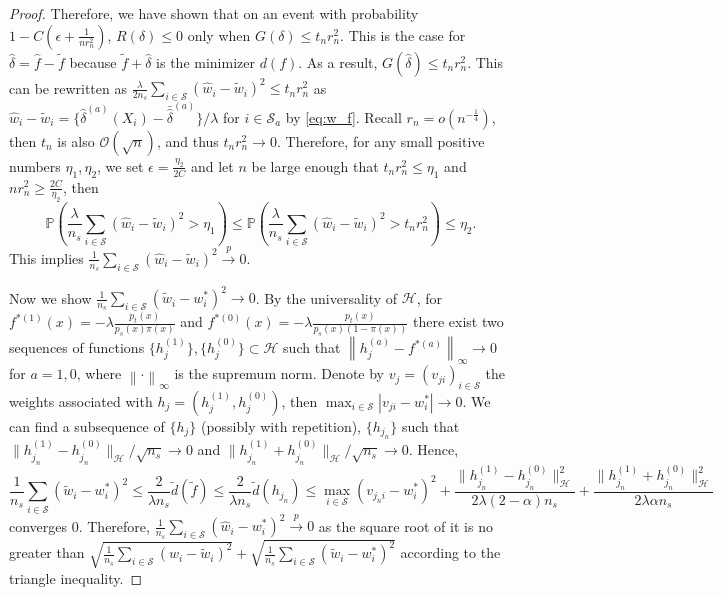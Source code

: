 \documentclass[12pt]{article}
\newcommand{\prob}{\mathbb{P}}
\begin{document}
\begin{proof}
	Therefore, we have shown that on an event with probability $1 - C(\epsilon + \frac{1}{n r_n^2})$, $R(\delta) \le 0$ only when $G(\delta) \le t_n r_n^2$. This is the case for $\hat{\delta} = \hat{f} - \tilde{f}$ because $\tilde{f} + \hat{\delta}$ is the minimizer $d(f)$. As a result, $G(\hat{\delta}) \le t_n r_n^2$. This can be rewritten as
	$
	\frac{\lambda}{2 n_s} \sum_{i \in \mathcal{S}} (\hat{w}_i - \tilde{w}_i)^2 \le t_n r_n^2
	$ as $\hat{w}_i - \tilde{w}_i = \{ \hat{\delta}^{(a)}(X_i) - \bar{\hat{\delta}}^{(a)} \} / \lambda$ for $i \in \mathcal{S}_a$ by \eqref{eq:w_f}.
	Recall $r_n = o(n^{-\frac{1}{4}})$, then $t_n$ is also $\mathcal{O}(\sqrt{n})$, and thus $t_n r_n^2 \rightarrow 0$. Therefore, for any small positive numbers $\eta_1, \eta_2$, we set $\epsilon = \frac{\eta_2}{2C}$ and let $n$ be large enough that $t_n r_n^2 \le \eta_1$ and $n r_n^2 \ge \frac{2C}{\eta_2}$, then
	\begin{equation*}
		\prob \left( \frac{\lambda}{n_s}\sum_{i \in \mathcal{S}} (\hat{w}_i - \tilde{w}_i)^2 > \eta_1 \right) 
		\le 
		\prob \left( \frac{\lambda}{n_s}\sum_{i \in \mathcal{S}} (\hat{w}_i - \tilde{w}_i)^2 > t_n r_n^2\right) 
		\le \eta_2
		.\end{equation*}
	This implies
	$
	\frac{1}{n_s} \sum_{i \in \mathcal{S}} (\hat{w}_i - \tilde{w}_i)^2 \overset{p}{\longrightarrow} 0
	$.
	
	Now we show $\frac{1}{n_s} \sum_{i \in \mathcal{S}} (\tilde{w}_i - w^*_i)^2 \rightarrow 0$. By the universality of $\mathcal{H}$, for $f^{*(1)}(x) = -\lambda \frac{p_t(x)}{p_s(x)\pi(x)}$ and $f^{*(0)}(x) = -\lambda \frac{p_t(x)}{p_s(x)(1-\pi(x))}$ there exist two sequences of functions $\{h_j^{(1)}\}, \{h_j^{(0)}\} \subset \mathcal{H}$ such that $\left\| h_j^{(a)} - f^{*(a)}\right\|_\infty \rightarrow 0$ for $a = 1, 0$, where $\left\| \cdot \right\|_\infty$ is the supremum norm. Denote by $v_j = (v_{ji})_{i \in \mathcal{S}}$ the weights associated with $h_j = (h_j^{(1)}, h_j^{(0)})$, then $\max_{i \in \mathcal{S}} |v_{ji} - w^*_i| \rightarrow 0$. 
	We can find a subsequence of $\{h_j\}$ (possibly with repetition), $\{h_{j_n}\}$ such that $\| h_{j_n}^{(1)} - h_{j_n}^{(0)} \|_\mathcal{H} / \sqrt{n_s} \rightarrow 0$ and $\| h_{j_n}^{(1)} + h_{j_n}^{(0)} \|_\mathcal{H} / \sqrt{n_s} \rightarrow 0$. Hence,
	\begin{equation*}
		\frac{1}{n_s} \sum_{i \in \mathcal{S}} (\tilde{w}_i - w^*_i)^2
		\le
		\frac{2}{\lambda n_s}\tilde{d} (\tilde{f}) 
		\le
		\frac{2}{\lambda n_s}\tilde{d} (h_{j_n})
		\le \max_{i \in \mathcal{S}} (v_{j_n i} - w^*_i)^2 + 
		\frac{\| h_{j_n}^{(1)} - h_{j_n}^{(0)} \|_\mathcal{H}^2}{2\lambda(2-\alpha)n_s} +
		\frac{\| h_{j_n}^{(1)} + h_{j_n}^{(0)} \|_\mathcal{H}^2}{2\lambda\alpha n_s} 
	\end{equation*}
	converges 0. Therefore, $\frac{1}{n_s} \sum_{i \in \mathcal{S}} (\hat{w}_i - w^*_i)^2 \overset{p}{\longrightarrow} 0$ as the square root of it is no greater than $\sqrt{\frac{1}{n_s} \sum_{i \in \mathcal{S}} (\hat{w}_i - \tilde{w}_i)^2} + \sqrt{\frac{1}{n_s} \sum_{i \in \mathcal{S}} (\tilde{w}_i - w^*_i)^2}$ according to the triangle inequality.
	

\end{proof}
\end{document}
